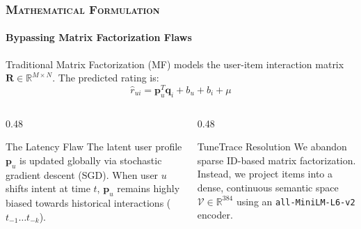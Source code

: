 \documentclass[aspectratio=169,10pt]{beamer}
\begin{document}
\begin{frame}
  \frametitle{\textsc{Mathematical Formulation}}
  \framesubtitle{Bypassing Matrix Factorization Flaws}
  
  Traditional Matrix Factorization (MF) models the user-item interaction matrix $\mathbf{R} \in \mathbb{R}^{M \times N}$. The predicted rating is:
  \begin{equation}
      \hat{r}_{ui} = \mathbf{p}_u^T \mathbf{q}_i + b_u + b_i + \mu
  \end{equation}

  \vspace{2mm}
  \begin{columns}[T]
    \begin{column}{0.48\textwidth}
      \begin{alertblock}{The Latency Flaw}
        \fontsize{7.5pt}{9.5pt}\selectfont
        The latent user profile $\mathbf{p}_u$ is updated globally via stochastic gradient descent (SGD). When user $u$ shifts intent at time $t$, $\mathbf{p}_u$ remains highly biased towards historical interactions ($t_{-1} \dots t_{-k}$).
      \end{alertblock}
    \end{column}
    \begin{column}{0.48\textwidth}
      \begin{block}{TuneTrace Resolution}
        \fontsize{7.5pt}{9.5pt}\selectfont
        We abandon sparse ID-based matrix factorization. Instead, we project items into a dense, continuous semantic space $\mathcal{V} \in \mathbb{R}^{384}$ using an \texttt{all-MiniLM-L6-v2} encoder.
      \end{block}
    \end{column}
  \end{columns}
\end{frame}

\end{document}
